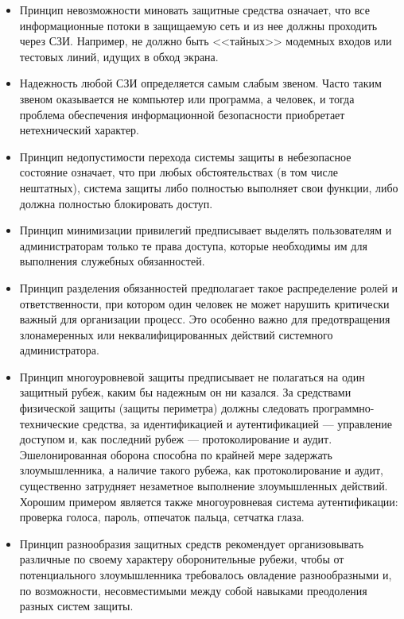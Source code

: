 \begin{itemize}

\item Принцип невозможности миновать защитные средства означает, что все информационные потоки в защищаемую сеть и из нее должны проходить через СЗИ. Например, не должно быть <<тайных>> модемных входов или тестовых линий, идущих в обход экрана.

\item Надежность любой СЗИ определяется самым \alert{слабым звеном}. Часто таким звеном оказывается не компьютер или программа, а человек, и тогда проблема обеспечения информационной безопасности приобретает нетехнический характер.

\item Принцип недопустимости перехода системы защиты в небезопасное состояние означает, что при любых обстоятельствах (в том числе нештатных), система защиты либо полностью выполняет свои функции, либо должна полностью блокировать доступ.

\item Принцип минимизации привилегий предписывает выделять пользователям и администраторам только те права доступа, которые необходимы им для выполнения служебных обязанностей.

\item Принцип разделения обязанностей предполагает такое распределение ролей и ответственности, при котором один человек не может нарушить критически важный для организации процесс. Это особенно важно для предотвращения злонамеренных или неквалифицированных действий системного администратора.

\item Принцип многоуровневой защиты предписывает не полагаться на один защитный рубеж, каким бы надежным он ни казался. За средствами физической защиты (защиты периметра) должны следовать программно-технические средства, за идентификацией и аутентификацией --- управление доступом и, как последний рубеж --- протоколирование и аудит. Эшелонированная оборона способна по крайней мере задержать злоумышленника, а наличие такого рубежа, как протоколирование и аудит, существенно затрудняет незаметное выполнение злоумышленных действий. Хорошим примером является также многоуровневая система аутентификации: проверка голоса, пароль, отпечаток пальца, сетчатка глаза.

\item Принцип разнообразия защитных средств рекомендует организовывать различные по своему характеру оборонительные рубежи, чтобы от потенциального злоумышленника требовалось овладение разнообразными и, по возможности, несовместимыми между собой навыками преодоления разных систем защиты.


\end{itemize}
